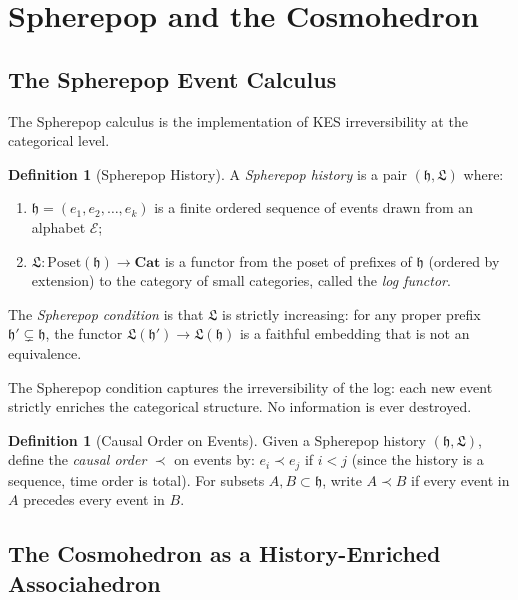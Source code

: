 \documentclass[12pt, oneside]{amsart}
\theoremstyle{plain}
\theoremstyle{definition}
\newtheorem{definition}[theorem]{Definition}
\theoremstyle{remark}
\newcommand{\EKS}{\mathcal{E}}
\newcommand{\hist}{\mathfrak{h}}
\newcommand{\Log}{\mathfrak{L}}
\begin{document}
\section{Spherepop and the Cosmohedron}
\label{sec:spherepop}

\subsection{The Spherepop Event Calculus}

The Spherepop calculus is the implementation of KES irreversibility at the categorical level.

\begin{definition}[Spherepop History]
\label{def:spherepop}
A \emph{Spherepop history} is a pair $(\hist, \Log)$ where:
\begin{enumerate}[label=(\roman*)]
  \item $\hist = (e_1, e_2, \ldots, e_k)$ is a finite ordered sequence of events drawn from an alphabet $\EKS$;
  \item $\Log: \text{Poset}(\hist) \to \mathbf{Cat}$ is a functor from the poset of prefixes of $\hist$ (ordered by extension) to the category of small categories, called the \emph{log functor}.
\end{enumerate}
The \emph{Spherepop condition} is that $\Log$ is strictly increasing: for any proper prefix $\hist' \subsetneq \hist$, the functor $\Log(\hist') \to \Log(\hist)$ is a faithful embedding that is not an equivalence.
\end{definition}

The Spherepop condition captures the irreversibility of the log: each new event strictly enriches the categorical structure. No information is ever destroyed.

\begin{definition}[Causal Order on Events]
\label{def:causal-order}
Given a Spherepop history $(\hist, \Log)$, define the \emph{causal order} $\prec$ on events by: $e_i \prec e_j$ if $i < j$ (since the history is a sequence, time order is total). For subsets $A, B \subset \hist$, write $A \prec B$ if every event in $A$ precedes every event in $B$.
\end{definition}

\subsection{The Cosmohedron as a History-Enriched Associahedron}
\end{document}
